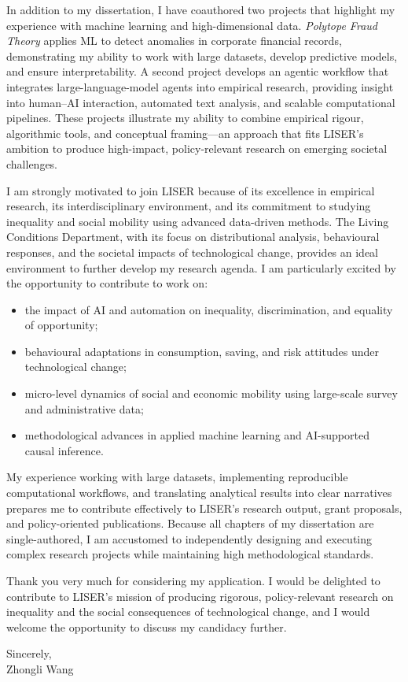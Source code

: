 \documentclass[11pt]{article}
\begin{document}
In addition to my dissertation, I have coauthored two projects that highlight my experience with machine learning and high-dimensional data.  
\emph{Polytope Fraud Theory} applies ML to detect anomalies in corporate financial records, demonstrating my ability to work with large datasets, develop predictive models, and ensure interpretability.  
A second project develops an agentic workflow that integrates large-language-model agents into empirical research, providing insight into human–AI interaction, automated text analysis, and scalable computational pipelines.  
These projects illustrate my ability to combine empirical rigour, algorithmic tools, and conceptual framing—an approach that fits LISER’s ambition to produce high-impact, policy-relevant research on emerging societal challenges.

I am strongly motivated to join LISER because of its excellence in empirical research, its interdisciplinary environment, and its commitment to studying inequality and social mobility using advanced data-driven methods. The Living Conditions Department, with its focus on distributional analysis, behavioural responses, and the societal impacts of technological change, provides an ideal environment to further develop my research agenda. I am particularly excited by the opportunity to contribute to work on:
\begin{itemize}
    \item the impact of AI and automation on inequality, discrimination, and equality of opportunity;
    \item behavioural adaptations in consumption, saving, and risk attitudes under technological change;
    \item micro-level dynamics of social and economic mobility using large-scale survey and administrative data;
    \item methodological advances in applied machine learning and AI-supported causal inference.
\end{itemize}

My experience working with large datasets, implementing reproducible computational workflows, and translating analytical results into clear narratives prepares me to contribute effectively to LISER’s research output, grant proposals, and policy-oriented publications.  
Because all chapters of my dissertation are single-authored, I am accustomed to independently designing and executing complex research projects while maintaining high methodological standards.

Thank you very much for considering my application. I would be delighted to contribute to LISER’s mission of producing rigorous, policy-relevant research on inequality and the social consequences of technological change, and I would welcome the opportunity to discuss my candidacy further.

\vspace{6mm}

\noindent Sincerely,\\[15mm]
\noindent Zhongli Wang
\end{document}
